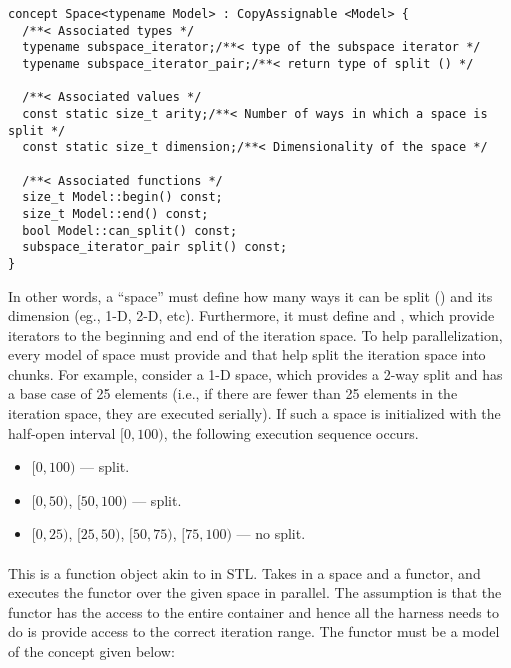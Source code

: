 \begin{center}
\begin{minipage}{0.7\textwidth}
\begin{lstlisting}
concept Space<typename Model> : CopyAssignable <Model> {
  /**< Associated types */
  typename subspace_iterator;/**< type of the subspace iterator */
  typename subspace_iterator_pair;/**< return type of split () */
  
  /**< Associated values */
  const static size_t arity;/**< Number of ways in which a space is split */
  const static size_t dimension;/**< Dimensionality of the space */

  /**< Associated functions */
  size_t Model::begin() const;
  size_t Model::end() const;
  bool Model::can_split() const;
  subspace_iterator_pair split() const;
}
\end{lstlisting}
\end{minipage}
\end{center}

In other words, a ``space'' must define how many ways it can be split
() and its dimension (eg., 1-D, 2-D, etc).
%
Furthermore, it must define  and , which provide 
iterators to the beginning and end of the iteration space.
%
To help parallelization, every model of space must provide 
and  that help split the iteration space into  chunks.
%
For example, consider a 1-D space, which provides a 2-way split and has a 
base case of 25 elements (i.e., if there are fewer than 25 elements in the 
iteration space, they are executed serially).
%
If such a space is initialized with the half-open interval $[0, 100)$, the 
following execution sequence occurs.

\begin{center}
\begin{minipage}{0.6\textwidth}
\begin{itemize}
\item[] $[0,100)$ --- split.
\item[] $[0,50)$, $[50,100)$ --- split.
\item[] $[0,25)$, $[25,50)$, $[50,75)$, $[75,100)$ --- no split.
\end{itemize}
\end{minipage}
\end{center}

\paragraph{} This is a function object akin to 
 in STL.
%
 Takes in a space and a functor, and executes the 
functor over the given space in parallel.
%
The assumption is that the functor has the access to the entire container
and hence all the harness needs to do is provide access to the correct 
iteration range.
%
The functor must be a model of the  concept given below:

